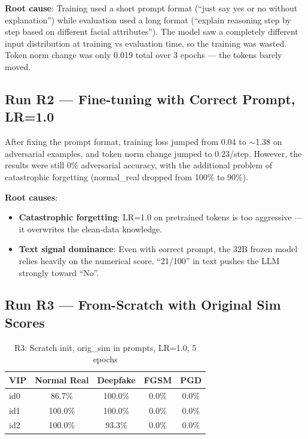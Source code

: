\documentclass[12pt,a4paper]{article}
\begin{document}
\textbf{Root cause}: Training used a short prompt format (``just say yes or no without explanation'') while evaluation used a long format (``explain reasoning step by step based on different facial attributes''). The model saw a completely different input distribution at training vs evaluation time, so the training was wasted. Token norm change was only 0.019 total over 3 epochs --- the tokens barely moved.

\subsection{Run R2 --- Fine-tuning with Correct Prompt, LR=1.0}

After fixing the prompt format, training loss jumped from 0.04 to $\sim$1.38 on adversarial examples, and token norm change jumped to 0.23/step. However, the results were still 0\% adversarial accuracy, with the additional problem of catastrophic forgetting (normal\_real dropped from 100\% to 90\%).

\textbf{Root causes}:
\begin{itemize}
    \item \textbf{Catastrophic forgetting}: LR=1.0 on pretrained tokens is too aggressive --- it overwrites the clean-data knowledge.
    \item \textbf{Text signal dominance}: Even with correct prompt, the 32B frozen model relies heavily on the numerical score. ``21/100'' in text pushes the LLM strongly toward ``No''.
\end{itemize}

\subsection{Run R3 --- From-Scratch with Original Sim Scores}

\begin{table}[H]
\centering
\caption{R3: Scratch init, orig\_sim in prompts, LR=1.0, 5 epochs}
\begin{tabular}{@{}lcccc@{}}
\toprule
\textbf{VIP} & \textbf{Normal Real} & \textbf{Deepfake} & \textbf{FGSM} & \textbf{PGD} \\
\midrule
id0 & 86.7\% & 100.0\% & 0.0\% & 0.0\% \\
id1 & 100.0\% & 100.0\% & 0.0\% & 0.0\% \\
id2 & 100.0\% & 93.3\% & 0.0\% & 0.0\% \\
\bottomrule
\end{tabular}
\end{table}
\end{document}
